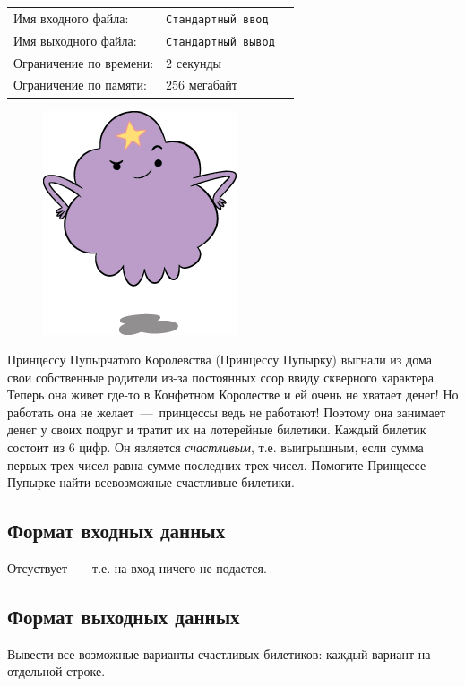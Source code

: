 \documentclass[12pt]{scrartcl}
\newcommand{\inputFile}{Стандартный ввод}
\newcommand{\outputFile}{Стандартный вывод}
\begin{document}
\begin{tabularx}{\textwidth}{l l X}
    Имя входного файла: & \texttt{\inputFile} \\
    Имя выходного файла: & \texttt{\outputFile} \\
    Ограничение по времени: & $2$ секунды \\
    Ограничение по памяти: & $256$ мегабайт \\
\end{tabularx}

\begin{figure}[h]
    \includegraphics[scale=0.6]{lsp}
\end{figure}

Принцессу Пупырчатого Королевства (Принцессу Пупырку) выгнали из дома свои собственные родители из-за постоянных ссор ввиду скверного характера. Теперь она живет где-то в Конфетном Королестве и ей очень не хватает денег! Но работать она не желает~---~принцессы ведь не работают! Поэтому она занимает денег у своих подруг и тратит их на лотерейные билетики. Каждый билетик состоит из 6 цифр. Он является \emph{счастливым}, т.е. выигрышным, если сумма первых трех чисел равна сумме последних трех чисел. Помогите Принцессе Пупырке найти всевозможные счастливые билетики.

\subsection*{Формат входных данных}
Отсуствует~---~т.е. на вход ничего не подается.

\subsection*{Формат выходных данных}
Вывести все возможные варианты счастливых билетиков: каждый вариант на отдельной строке.
\end{document}
